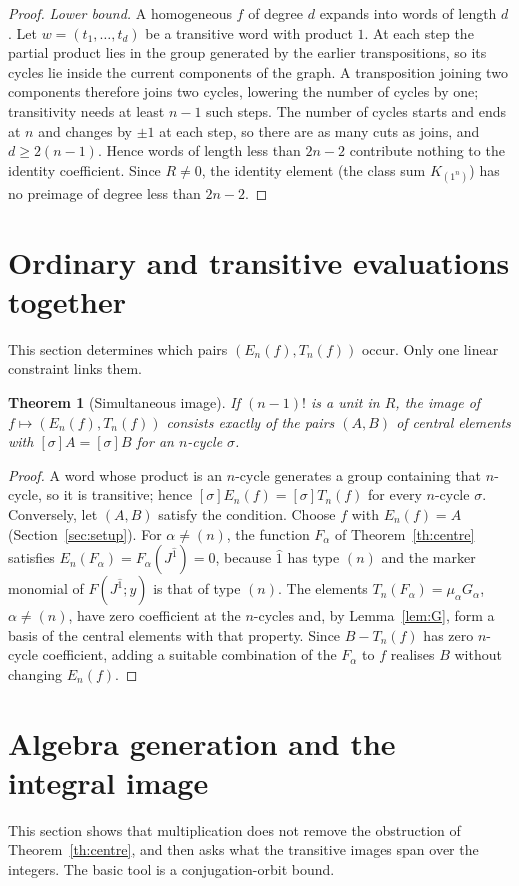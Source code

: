 \documentclass[11pt,a4paper]{article}
\newtheorem{theorem}{Theorem}[section]
\theoremstyle{definition}
\begin{document}
\begin{proof}
\emph{Lower bound.} A homogeneous $f$ of degree $d$ expands into words of length $d$. Let $w=(t_1,\ldots,t_d)$ be a transitive word with product $1$. At each step the partial product lies in the group generated by the earlier transpositions, so its cycles lie inside the current components of the graph. A transposition joining two components therefore joins two cycles, lowering the number of cycles by one; transitivity needs at least $n-1$ such steps. The number of cycles starts and ends at $n$ and changes by $\pm1$ at each step, so there are as many cuts as joins, and $d\ge2(n-1)$. Hence words of length less than $2n-2$ contribute nothing to the identity coefficient. Since $R\ne0$, the identity element (the class sum $K_{(1^n)}$) has no preimage of degree less than $2n-2$.
\end{proof}

\section{Ordinary and transitive evaluations together}\label{sec:pair}
This section determines which pairs $(E_n(f),T_n(f))$ occur. Only one linear constraint links them.

\begin{theorem}[Simultaneous image]\label{th:pair}
If $(n-1)!$ is a unit in $R$, the image of $f\mapsto(E_n(f),T_n(f))$ consists exactly of the pairs $(A,B)$ of central elements with $[\sigma]A=[\sigma]B$ for an $n$-cycle $\sigma$.
\end{theorem}
\begin{proof}
A word whose product is an $n$-cycle generates a group containing that $n$-cycle, so it is transitive; hence $[\sigma]E_n(f)=[\sigma]T_n(f)$ for every $n$-cycle $\sigma$. Conversely, let $(A,B)$ satisfy the condition. Choose $f$ with $E_n(f)=A$ (Section~\ref{sec:setup}). For $\alpha\ne(n)$, the function $F_\alpha$ of Theorem~\ref{th:centre} satisfies $E_n(F_\alpha)=F_\alpha(J^{\hat1})=0$, because $\hat1$ has type $(n)$ and the marker monomial of $F(J^{\hat1};y)$ is that of type $(n)$. The elements $T_n(F_\alpha)=\mu_\alpha G_\alpha$, $\alpha\ne(n)$, have zero coefficient at the $n$-cycles and, by Lemma~\ref{lem:G}, form a basis of the central elements with that property. Since $B-T_n(f)$ has zero $n$-cycle coefficient, adding a suitable combination of the $F_\alpha$ to $f$ realises $B$ without changing $E_n(f)$.
\end{proof}

\section{Algebra generation and the integral image}\label{sec:integral}
This section shows that multiplication does not remove the obstruction of Theorem~\ref{th:centre}, and then asks what the transitive images span over the integers. The basic tool is a conjugation-orbit bound.
\end{document}
